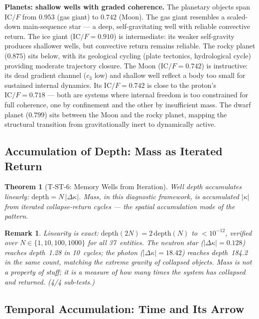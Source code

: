 \documentclass[
  aps,
  prd,
  twocolumn,
  superscriptaddress,
  nofootinbib,
  floatfix
]{revtex4-2}
\newtheorem{theorem}{Theorem}
\newtheorem{remark}{Remark}
\newcommand{\IC}{\mathrm{IC}}
\begin{document}
\textbf{Planets: shallow wells with graded coherence.}
The planetary objects span $\IC/F$ from $0.953$ (gas giant)
to $0.742$ (Moon).  The gas giant resembles a scaled-down
main-sequence star --- a deep, self-gravitating well with
reliable convective return.  The ice giant ($\IC/F = 0.910$)
is intermediate: its weaker self-gravity produces shallower
wells, but convective return remains reliable.
The rocky planet ($0.875$)
sits below, with its geological cycling (plate tectonics,
hydrological cycle) providing moderate trajectory closure.
The Moon ($\IC/F = 0.742$) is instructive: its dead
gradient channel ($c_3$ low) and shallow well reflect a
body too small for sustained internal dynamics.  Its
$\IC/F = 0.742$ is close to the proton's
$\IC/F = 0.718$ --- both are systems where internal freedom
is too constrained for full coherence, one by confinement
and the other by insufficient mass.  The dwarf planet
($0.799$) sits between the Moon and the rocky planet,
mapping the structural transition from gravitationally
inert to dynamically active.

\subsection{Accumulation of Depth: Mass as Iterated Return}

\begin{theorem}[T-ST-6: Memory Wells from Iteration]
\label{thm:T6}
Well depth accumulates linearly:
$\mathrm{depth} = N\,|\Delta\kappa|$.
Mass, in this diagnostic framework, is accumulated $|\kappa|$
from iterated collapse-return cycles --- the spatial
accumulation mode of the pattern.
\end{theorem}

\begin{remark}
Linearity is exact: $\mathrm{depth}(2N) = 2\,\mathrm{depth}(N)$
to $< 10^{-12}$, verified over $N \in \{1, 10, 100, 1000\}$
for all 37~entities.  The neutron star ($|\Delta\kappa| = 0.128$)
reaches depth~1.28 in 10~cycles; the photon ($|\Delta\kappa| =
18.42$) reaches depth~184.2 in the same count, matching the
extreme gravity of collapsed objects.  Mass is not a property
of stuff; it is a measure of how many times the system has
collapsed and returned.  (4/4 sub-tests.)
\end{remark}


\subsection{Temporal Accumulation: Time and Its Arrow}\label{sec:time}
\end{document}
